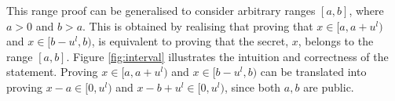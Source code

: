 \begin{comment}
\begin{algorithm}[]
\caption{\textbf{: Non interactive range proof}}
\textbf{Goal:} Given a Pedersen commitment $C=g^x h^R$ and two parameters $u,l$, prove that the secret $x=\sum_{j=0}^l x_j u^j$ belongs to the interval $[0,u^l)$ without revealing anything else about $x$.
\vspace{2pt}
\hline
\vspace{2pt}
\begin{itemize}
  \item\textbf{SetUp $(g,h,u,l)\xrightarrow[]{}(y,\{A_{i}\}_{i\in\mathds{Z}_u})$}\\
Pick uniformly at random $\chi\in_R\mathds{F}$. Define $y=g^\chi$ and $A_i=g^{\frac{1}{\chi+i}} \: \forall i\in\mathds{Z}_u$, output $y$ and $\{A_i\}$.

\item\text{\textbf{Prove} $(g,h,C,u,l)\xrightarrow[]{}\textit{ proof}_{RP}=(\{V_j\},\{a_j\},D,\{z_{x_j}\},\{z_{\tau_j}\},z_R)$}\\
 For every $j\in\mathds{Z}_l$: pick uniformly at random $\tau_j\in_R\mathds{F}$ and compute $V_j=A_{x_j}^{\tau_j}$. Then pick uniformly at random three more values $s_j,t_j,m_j\in_R\mathds{F}$ and compute $a_j=e(V_j,g)^{-s_j}e(g,g)^{t_j}$ for all $j\in\mathds{Z}_l$ and $D=\prod_{j\in\mathds{Z}_l}(g^{u^js_j})h^{m_j}$ Given this let $c=\text{Hash}(C,\{V_j\}\{a_j\},D)$. Then for all $j\in\mathds{Z}_l$ compute $z_{x_j}=s_j-x_jc$,$z_{\tau_j}=t_j-\tau_jc$ and $z_R=m-Rc$, where $m=\sum_{j\in\mathds{Z}_l}m_j$. Finally output the proof: \textit{proof}$_{RP}=(\{V_j\},\{a_j\},D,\{z_{x_j}\},\{z_{\tau_j}\},z_R)$ 

\item\text{\textbf{Verify} $(g,h,C,\textit{proof})\xrightarrow[]{}\{0,1\}$}\\
Check if $D\overset{?}{=}C^ch^{z_R}\prod_{j\in\mathds{Z}_l}(g^{u^j z_{x_j}})\wedge a_j \overset{?}{=} e(V_j,y)^c e(V_j,g)^{-z_{x_j}}e(g,g)^{z_{\tau_j}}$ for all $j\in\mathds{Z}_l$.  If the equality holds the prover has convinced the verifier that $x\in [0,u^l)$ return $1$ otherwise return $0$.
\end{itemize}
\label{alg:ZKRP}
\end{algorithm}
\end{comment}

This range proof  can be generalised to consider arbitrary ranges  $[a,b]$, where $a>0$ and  $b>a$. This is obtained by realising that proving that $x\in[a,a+u^l)$ and $x\in[b-u^l,b)$, is equivalent to proving that the secret, $x$, belongs to the range $[a,b]$. Figure \ref{fig:interval} illustrates the intuition and correctness of the statement.  Proving $x\in[a,a+u^l)$ and $x\in[b-u^l,b)$ can be translated into proving $x-a\in[0,u^l)$ and $x-b+u^l\in[0,u^l)$, since both $a,b$ are public. 


